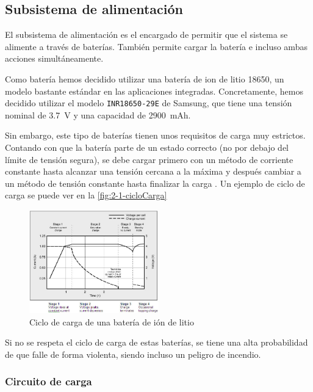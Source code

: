 \subsection{Subsistema de alimentación}

El subsistema de alimentación es el encargado de permitir que el sistema se alimente a través de baterías. También permite cargar la batería e incluso ambas acciones simultáneamente.

Como batería hemos decidido utilizar una batería de ion de litio 18650, un modelo bastante estándar en las aplicaciones integradas.  Concretamente, hemos decidido utilizar el modelo \texttt{INR18650-29E} de Samsung, que tiene una tensión nominal de 3.7\ V y una capacidad de 2900\ mAh.

Sin embargo, este tipo de baterías tienen unos requisitos de carga muy estrictos. Contando con que la batería parte de un estado correcto (no por debajo del límite de tensión segura), se debe cargar primero con un método de corriente constante hasta alcanzar una tensión cercana a la máxima y después cambiar a un método de tensión constante hasta finalizar la carga \cite{BU409ChargingLithiumion}. Un ejemplo de ciclo de carga se puede ver en la \autoref{fig:2-1-cicloCarga}

\begin{figure}[h]
    \centering
    \includegraphics[width=0.5\textwidth]{images/2/2-1/cargaBateria.png}
    \caption{Ciclo de carga de una batería de ión de litio}
    \label{fig:2-1-cicloCarga}
\end{figure}

Si no se respeta el ciclo de carga de estas baterías, se tiene una alta probabilidad de que falle de forma violenta, siendo incluso un peligro de incendio. 

\subsubsection{Circuito de carga}

